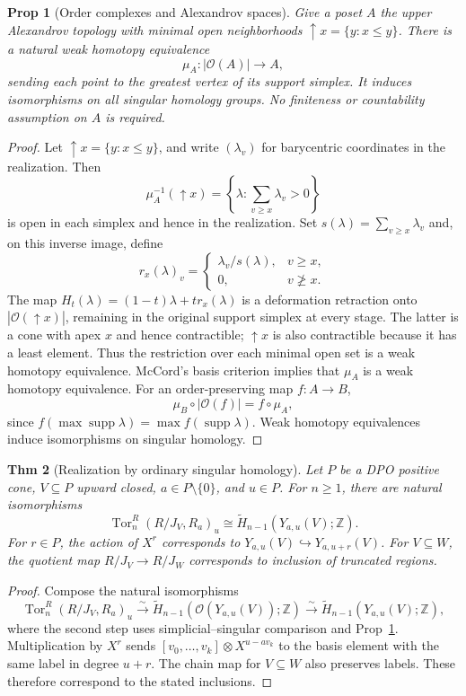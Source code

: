 \documentclass[10pt,letterpaper]{amsart}
\numberwithin{equation}{section}
\newtheorem{thm}{Thm}[section]
\newtheorem{prop}[thm]{Prop}
\theoremstyle{definition}
\newcommand{\Z}{\mathbb Z}
\newcommand{\Tor}{\operatorname{Tor}}
\newcommand{\supp}{\operatorname{supp}}
\newcommand{\ord}{\mathcal O}
\newcommand{\up}{\uparrow}
\begin{document}
\begin{prop}[Order complexes and Alexandrov spaces]\label{prop:mccord}
Give a poset $A$ the upper Alexandrov topology with minimal open neighborhoods $\up x=\{y:x\le y\}$. There is a natural weak homotopy equivalence
\[
\mu_A:|\ord(A)|\longrightarrow A,
\]
sending each point to the greatest vertex of its support simplex. It induces isomorphisms on all singular homology groups. No finiteness or countability assumption on $A$ is required.
\end{prop}
\begin{proof}
Let $\up x=\{y:x\le y\}$, and write $(\lambda_v)$ for barycentric coordinates in the realization. Then
\[
\mu_A^{-1}(\up x)=\left\{\lambda:\sum_{v\ge x}\lambda_v>0\right\}
\]
is open in each simplex and hence in the realization. Set $s(\lambda)=\sum_{v\ge x}\lambda_v$ and, on this inverse image, define
\[
r_x(\lambda)_v=
\begin{cases}\lambda_v/s(\lambda),&v\ge x,\\0,&v\not\ge x.\end{cases}
\]
The map $H_t(\lambda)=(1-t)\lambda+t r_x(\lambda)$ is a deformation retraction onto $|\ord(\up x)|$, remaining in the original support simplex at every stage. The latter is a cone with apex $x$ and hence contractible; $\up x$ is also contractible because it has a least element.
Thus the restriction over each minimal open set is a weak homotopy equivalence. McCord's basis criterion \cite[Theorem 6]{McCord} implies that $\mu_A$ is a weak homotopy equivalence. For an order-preserving map $f:A\to B$,
\[
\mu_B\circ|\ord(f)|=f\circ\mu_A,
\]
since $f(\max\supp\lambda)=\max f(\supp\lambda)$. Weak homotopy equivalences induce isomorphisms on singular homology.
\end{proof}

\begin{thm}[Realization by ordinary singular homology]\label{thm:tor-singular}
Let $P$ be a DPO positive cone, $V\subseteq P$ upward closed, $a\in P\setminus\{0\}$, and $u\in P$. For $n\ge1$, there are natural isomorphisms
\[
\Tor_n^R(R/J_V,R_a)_u
\cong\widetilde H_{n-1}(Y_{a,u}(V);\Z).
\]
For $r\in P$, the action of $X^r$ corresponds to $Y_{a,u}(V)\hookrightarrow Y_{a,u+r}(V)$. For $V\subseteq W$, the quotient map $R/J_V\to R/J_W$ corresponds to inclusion of truncated regions.
\end{thm}
\begin{proof}
Compose the natural isomorphisms
\[
\Tor_n^R(R/J_V,R_a)_u
\xrightarrow{\sim}\widetilde H_{n-1}(\ord(Y_{a,u}(V));\Z)
\xrightarrow{\sim}\widetilde H_{n-1}(Y_{a,u}(V);\Z),
\]
where the second step uses simplicial--singular comparison and Prop~\ref{prop:mccord}. Multiplication by $X^r$ sends $[v_0,\ldots,v_k]\otimes X^{u-av_k}$ to the basis element with the same label in degree $u+r$. The chain map for $V\subseteq W$ also preserves labels. These therefore correspond to the stated inclusions.
\end{proof}
\end{document}
